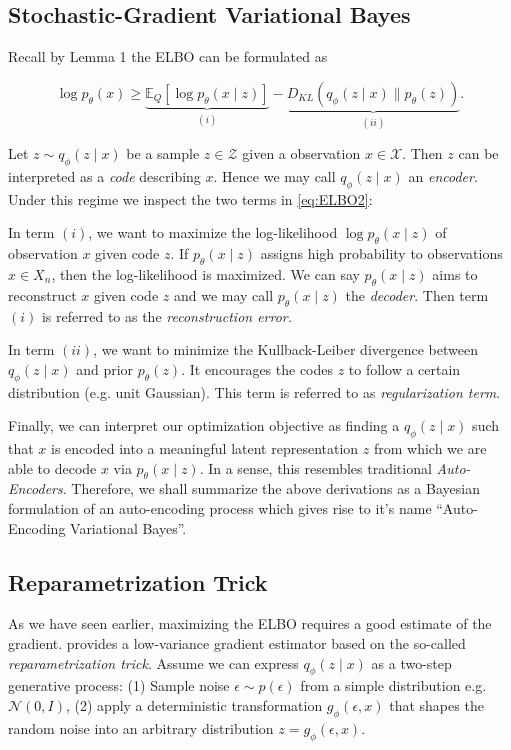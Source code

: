 \documentclass[11pt]{article}
\theoremstyle{plain}
\theoremstyle{definition}
\theoremstyle{plain}
\begin{document}
\subsection{Stochastic-Gradient Variational Bayes}

Recall by Lemma 1 the ELBO can be formulated as

\begin{equation}
\log p_{\theta}(x)\geq\underbrace{\mathbb{E}_{Q}\left[\log p_{\theta}(x\mid z)\right]}_{(i)}-\underbrace{D_{KL}\left(q_{\phi}(z\mid x)\rVert p_{\theta}(z)\right)}_{(ii)}.\label{eq:ELBO2}
\end{equation}

\noindent Let $z\sim q_{\phi}(z\mid x)$ be a sample $z\in\mathcal{Z}$
given a observation $x\in\mathcal{X}$. Then $z$ can be interpreted
as a \textit{code} describing $x$. Hence we may call $q_{\phi}(z\mid x)$
an \textit{encoder}. Under this regime we inspect the two terms in
\eqref{eq:ELBO2}:

In term $(i)$, we want to maximize the log-likelihood $\log p_{\theta}(x\mid z)$
of observation $x$ given code $z$. If $p_{\theta}(x\mid z)$ assigns
high probability to observations $x\in X_{n}$, then the log-likelihood
is maximized. We can say $p_{\theta}(x\mid z)$ aims to reconstruct
$x$ given code $z$ and we may call $p_{\theta}(x\mid z)$ the \textit{decoder}.
Then term $(i)$ is referred to as the \textit{reconstruction error.}

In term $(ii)$, we want to minimize the Kullback-Leiber divergence
between $q_{\phi}(z\mid x)$ and prior $p_{\theta}(z)$. It encourages
the codes $z$ to follow a certain distribution (e.g. unit Gaussian).
This term is referred to as \textit{regularization term}.

Finally, we can interpret our optimization objective as finding a
$q_{\phi}(z\mid x)$ such that $x$ is encoded into a meaningful latent
representation $z$ from which we are able to decode $x$ via $p_{\theta}(x\mid z)$.
In a sense, this resembles traditional \textit{Auto-Encoders}. Therefore,
we shall summarize the above derivations as a Bayesian formulation
of an auto-encoding process which gives rise to it's name ``Auto-Encoding
Variational Bayes''.

\subsection{Reparametrization Trick}

As we have seen earlier, maximizing the ELBO requires a good estimate
of the gradient. \cite{journals/corr/KingmaW13} provides a low-variance
gradient estimator based on the so-called \textit{reparametrization
trick}. Assume we can express $q_{\phi}(z\mid x)$ as a two-step generative
process: (1) Sample noise $\epsilon\sim p(\epsilon)$ from a simple
distribution e.g. $\mathcal{N}(0,I)$, (2) apply a deterministic transformation
$g_{\phi}(\epsilon,x)$ that shapes the random noise into an arbitrary
distribution $z=g_{\phi}(\epsilon,x)$.
\end{document}
